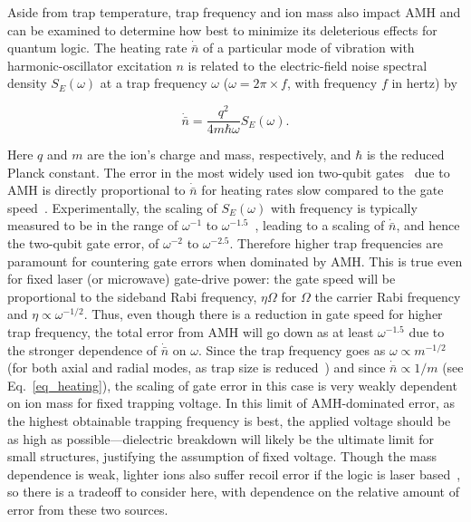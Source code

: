 \documentclass[%
12pt,
 amsmath,amssymb,
]{revtex4-2}
\begin{document}
Aside from trap temperature, trap frequency and ion mass also impact AMH and can be examined to determine how best to minimize its deleterious effects for quantum logic.  The heating rate $\dot{\bar{n}}$ of a particular mode of vibration with harmonic-oscillator excitation $n$ is related to the electric-field noise spectral density $S_{E}(\omega)$ at a trap frequency $\omega$ ($\omega=2\pi\times f$, with frequency $f$ in hertz) by

\begin{equation}
\dot{\bar{n}}=\frac{q^2}{4 m \hbar \omega}S_{E}(\omega).
\label{eq_heating}
\end{equation}

\noindent Here $q$ and $m$ are the ion's charge and mass, respectively, and $\hbar$ is the reduced Planck constant.  The error in the most widely used ion two-qubit gates~\cite{PhysRevA.62.022311_2000,LeibfriedDidiGate2003} due to AMH is directly proportional to $\dot{\bar{n}}$ for heating rates slow compared to the gate speed~\cite{Ballance2QubitHyperfineGate2016}.  Experimentally, the scaling of $S_{E}(\omega)$ with frequency is typically measured to be in the range of $\omega^{-1}$ to $\omega^{-1.5}$~\cite{PhysRevLett.109.103001_2012,PhysRevB.89.245435_2014,PhysRevLett.120.023201,PhysRevA.97.020302_2018}, leading to a scaling of $\dot{\bar{n}}$, and hence the two-qubit gate error, of $\omega^{-2}$ to $\omega^{-2.5}$.  Therefore higher trap frequencies are paramount for countering gate errors when dominated by AMH.  This is true even for fixed laser (or microwave) gate-drive power:  the gate speed will be proportional to the sideband Rabi frequency, $\eta \Omega$ for $\Omega$ the carrier Rabi frequency and $\eta\propto\omega^{-1/2}$. Thus, even though there is a reduction in gate speed for higher trap frequency, the total error from AMH will go down as at least $\omega^{-1.5}$ due to the stronger dependence of $\dot{\bar{n}}$ on $\omega$.  Since the trap frequency goes as $\omega\propto m^{-1/2}$ (for both axial and radial modes, as trap size is reduced~\cite{NIST:SET:QIC:05}) and since $\dot{\bar{n}}\propto1/m$ (see Eq.~\ref{eq_heating}), the scaling of gate error in this case is very weakly dependent on ion mass for fixed trapping voltage.  In this limit of AMH-dominated error, as the highest obtainable trapping frequency is best, the applied voltage should be as high as possible---dielectric breakdown will likely be the ultimate limit for small structures, justifying the assumption of fixed voltage.  Though the mass dependence is weak, lighter ions also suffer recoil error if the logic is laser based~\cite{PhysRevA.75.042329_2007}, so there is a tradeoff to consider here, with dependence on the relative amount of error from these two sources.
\end{document}
